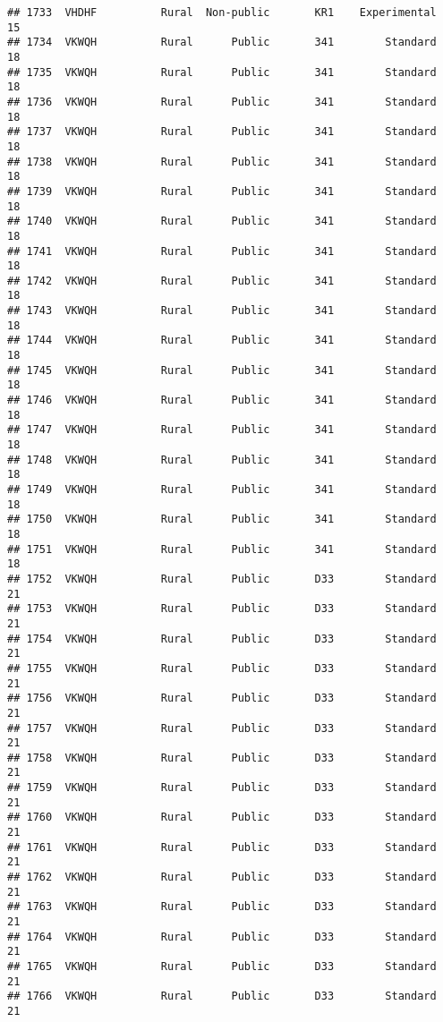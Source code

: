 \documentclass[
]{article}
\begin{document}
\begin{verbatim}
## 1733  VHDHF          Rural  Non-public       KR1    Experimental        15
## 1734  VKWQH          Rural      Public       341        Standard        18
## 1735  VKWQH          Rural      Public       341        Standard        18
## 1736  VKWQH          Rural      Public       341        Standard        18
## 1737  VKWQH          Rural      Public       341        Standard        18
## 1738  VKWQH          Rural      Public       341        Standard        18
## 1739  VKWQH          Rural      Public       341        Standard        18
## 1740  VKWQH          Rural      Public       341        Standard        18
## 1741  VKWQH          Rural      Public       341        Standard        18
## 1742  VKWQH          Rural      Public       341        Standard        18
## 1743  VKWQH          Rural      Public       341        Standard        18
## 1744  VKWQH          Rural      Public       341        Standard        18
## 1745  VKWQH          Rural      Public       341        Standard        18
## 1746  VKWQH          Rural      Public       341        Standard        18
## 1747  VKWQH          Rural      Public       341        Standard        18
## 1748  VKWQH          Rural      Public       341        Standard        18
## 1749  VKWQH          Rural      Public       341        Standard        18
## 1750  VKWQH          Rural      Public       341        Standard        18
## 1751  VKWQH          Rural      Public       341        Standard        18
## 1752  VKWQH          Rural      Public       D33        Standard        21
## 1753  VKWQH          Rural      Public       D33        Standard        21
## 1754  VKWQH          Rural      Public       D33        Standard        21
## 1755  VKWQH          Rural      Public       D33        Standard        21
## 1756  VKWQH          Rural      Public       D33        Standard        21
## 1757  VKWQH          Rural      Public       D33        Standard        21
## 1758  VKWQH          Rural      Public       D33        Standard        21
## 1759  VKWQH          Rural      Public       D33        Standard        21
## 1760  VKWQH          Rural      Public       D33        Standard        21
## 1761  VKWQH          Rural      Public       D33        Standard        21
## 1762  VKWQH          Rural      Public       D33        Standard        21
## 1763  VKWQH          Rural      Public       D33        Standard        21
## 1764  VKWQH          Rural      Public       D33        Standard        21
## 1765  VKWQH          Rural      Public       D33        Standard        21
## 1766  VKWQH          Rural      Public       D33        Standard        21

\end{verbatim}
\end{document}
